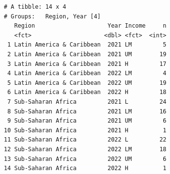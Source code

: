\documentclass[
  letterpaper,
  DIV=11,
  numbers=noendperiod]{scrreprt}
\begin{document}
\begin{verbatim}
# A tibble: 14 x 4
# Groups:   Region, Year [4]
   Region                     Year Income     n
   <fct>                     <dbl> <fct>  <int>
 1 Latin America & Caribbean  2021 LM         5
 2 Latin America & Caribbean  2021 UM        19
 3 Latin America & Caribbean  2021 H         17
 4 Latin America & Caribbean  2022 LM         4
 5 Latin America & Caribbean  2022 UM        19
 6 Latin America & Caribbean  2022 H         18
 7 Sub-Saharan Africa         2021 L         24
 8 Sub-Saharan Africa         2021 LM        16
 9 Sub-Saharan Africa         2021 UM         6
10 Sub-Saharan Africa         2021 H          1
11 Sub-Saharan Africa         2022 L         22
12 Sub-Saharan Africa         2022 LM        18
13 Sub-Saharan Africa         2022 UM         6
14 Sub-Saharan Africa         2022 H          1
\end{verbatim}
\end{document}
